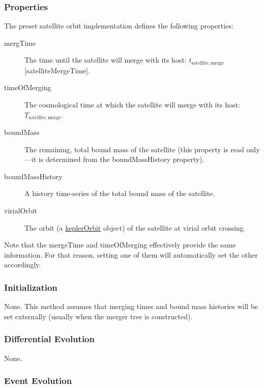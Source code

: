 \subsubsection{Properties}

The preset satellite orbit implementation defines the following properties:
\begin{description}
 \item [{\normalfont \ttfamily mergTime}] The time until the satellite will merge with its host: $t_\mathrm{satellite, merge}$ [{\normalfont \ttfamily satelliteMergeTime}].
 \item [{\normalfont \ttfamily timeOfMerging}] The cosmological time at which the satellite will merge with its host: $T_\mathrm{satellite, merge}$.
 \item [{\normalfont \ttfamily boundMass}] The remaining, total bound mass of the satellite (this property is read only---it is determined from the {\normalfont \ttfamily boundMassHistory} property).
 \item [{\normalfont \ttfamily boundMassHistory}] A history time-series of the total bound mass of the satellite.
 \item [{\normalfont \ttfamily virialOrbit}] The orbit (a \href{https://github.com/galacticusorg/galacticus/releases/download/masterRelease/Galacticus_Development.pdf\#sec.KeplerOrbits}{\normalfont \ttfamily keplerOrbit} object) of the satellite at virial orbit crossing.
\end{description}

Note that the {\normalfont \ttfamily mergeTime} and {\normalfont \ttfamily timeOfMerging} effectively provide the same information. For that reason, setting one of them will automatically set the other accordingly.

\subsubsection{Initialization}

None. This method assumes that merging times and bound mass histories will be set externally (usually when the merger tree is constructed).

\subsubsection{Differential Evolution}

None.

\subsubsection{Event Evolution}

